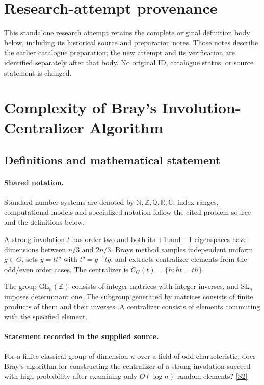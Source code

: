 \documentclass[11pt]{article}
\begin{document}
\section*{Research-attempt provenance}
This standalone research attempt retains the complete original definition body below,
including its historical source and preparation notes. Those notes describe the
earlier catalogue preparation; the new attempt and its verification are identified
separately after that body. No original ID, catalogue status, or source statement is changed.

\section{Complexity of Bray’s Involution-Centralizer Algorithm}\label{statement}

\subsection{Definitions and mathematical statement}

\paragraph{Shared notation.}Standard number systems are denoted by $\mathbb N,\mathbb Z,\mathbb Q,\mathbb R,\mathbb C$; index ranges, computational models and specialized notation follow the cited problem source and the definitions below.


A strong involution $t$ has order two and both its $+1$ and $-1$ eigenspaces have dimensions between $n/3$ and $2n/3$. Bray\textquotesingle s method samples independent uniform $g\in G$, sets $y=tt^g$ with $t^g=g^{-1}tg$, and extracts centralizer elements from the odd/even order cases. The centralizer is $C_G(t)=\{h:ht=th\}$.

The group $\mathrm{GL}_n(\mathbb Z)$ consists of integer matrices with integer inverses, and $\mathrm{SL}_n$ imposes determinant one. The subgroup generated by matrices consists of finite products of them and their inverses. A centralizer consists of elements commuting with the specified element.
\paragraph{Statement recorded in the supplied source.}
For a finite classical group of dimension $n$ over a field of odd characteristic, does Bray's algorithm for constructing the centralizer of a strong involution succeed with high probability after examining only $O(\log n)$ random elements? \href{https://doi.org/10.4171/owr/2016/37}{[S2]}
\end{document}
